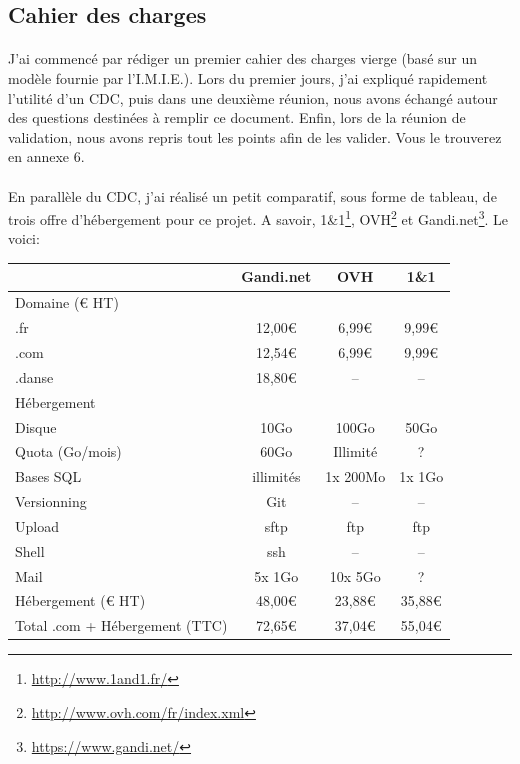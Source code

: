 \documentclass[11pt,a4paper]{report}
\begin{document}
		\subsection{Cahier des charges}
			\paragraph*{}J'ai commencé par rédiger un premier cahier des charges vierge (basé sur un modèle fournie par l'I.M.I.E.). Lors du premier jours, j'ai expliqué rapidement l'utilité d'un CDC, puis dans une deuxième réunion, nous avons échangé autour des questions destinées à remplir ce document. Enfin, lors de la réunion de validation, nous avons repris tout les points afin de les valider. Vous le trouverez en annexe 6.
			\paragraph*{}En parallèle du CDC, j'ai réalisé un petit comparatif, sous forme de tableau, de trois offre d'hébergement pour ce projet. A savoir, 1\&1\footnote{\url{http://www.1and1.fr/}}, OVH\footnote{\url{http://www.ovh.com/fr/index.xml}} et Gandi.net\footnote{\url{https://www.gandi.net/}}. Le voici:\\

				\begin{center}
					\begin{tabular}{|l|c|c|c|}
						\hline  & Gandi.net & OVH & 1\&1 \\ 
						\hline Domaine (\euro{} HT)\cellcolor[gray]{0.9} & \cellcolor[gray]{0.9} & \cellcolor[gray]{0.9} & \cellcolor[gray]{0.9} \\ 
						.fr & 12,00\euro{} & 6,99\euro{} & 9,99\euro{} \\ 
						.com & 12,54\euro{} & 6,99\euro{} & 9,99\euro{} \\ 
						.danse & 18,80\euro{} & -- & -- \\ 
						\hline Hébergement\cellcolor[gray]{0.9} & \cellcolor[gray]{0.9} & \cellcolor[gray]{0.9} & \cellcolor[gray]{0.9} \\ 
						Disque & 10Go & 100Go & 50Go \\ 
						Quota (Go/mois) & 60Go & Illimité & ? \\ 
						Bases SQL & illimités & 1x 200Mo & 1x 1Go \\
						Versionning  & Git & -- & -- \\ 
						Upload & sftp & ftp & ftp \\ 
						Shell & ssh & -- & -- \\ 
						Mail & 5x 1Go & 10x 5Go & ? \\ 
						Hébergement (\euro{} HT)\cellcolor[gray]{0.9} & 48,00\euro{}\cellcolor[gray]{0.9} & 23,88\euro{}\cellcolor[gray]{0.9} & 35,88\euro{}\cellcolor[gray]{0.9} \\ 
						Total .com + Hébergement (TTC)\cellcolor[gray]{0.7} & 72,65\euro{}\cellcolor[gray]{0.7} & 37,04\euro{}\cellcolor[gray]{0.7} & 55,04\euro{}\cellcolor[gray]{0.7} \\ 
						\hline 
					\end{tabular}
				\end{center}
\end{document}
